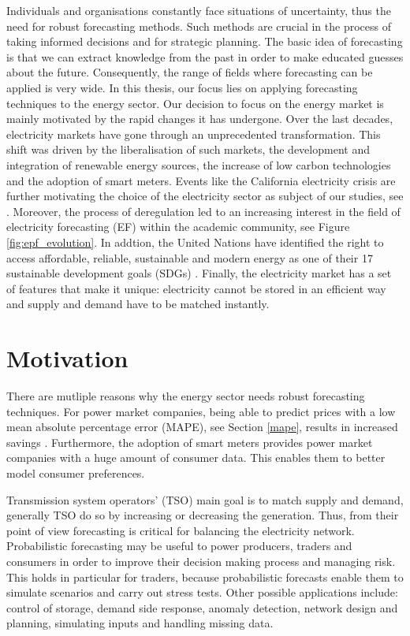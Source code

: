 Individuals and organisations constantly face situations of uncertainty, thus the need for robust forecasting methods. Such methods are crucial in the process of taking informed decisions and for strategic planning.
The basic idea of forecasting is that we can extract knowledge from the past in order to make educated guesses about the future. Consequently, the range of fields where forecasting can be applied is very wide.
In this thesis, our focus lies on applying forecasting techniques to the energy sector. 
Our decision to focus on the energy market is mainly motivated by the rapid changes it has undergone. %
Over the last decades, electricity markets have gone through an unprecedented transformation. This shift was driven by the liberalisation of such markets, the development and integration of renewable energy sources, the  increase of low carbon technologies and the adoption of smart meters. Events like the California electricity crisis are further motivating the choice of the electricity sector as subject of our studies, see \cite{california}.
Moreover, the process of deregulation led to an increasing interest in the field of electricity forecasting (EF) within the academic community, see Figure \ref{fig:epf_evolution}.
In addtion, the United Nations have identified the right to access affordable, reliable, sustainable and modern energy as one of their 17 sustainable development goals (SDGs) .
Finally, the electricity market has a set of features that make it unique: electricity cannot be stored in an efficient way and supply and demand have to be matched instantly.

\section{Motivation}
There are mutliple reasons why the energy sector needs robust forecasting techniques.
For power market companies, being able to predict prices with a low mean absolute percentage error (MAPE), see Section \ref{mape}, results in increased savings \cite{savings}. Furthermore, the adoption of smart meters provides power market companies with a huge amount of consumer data. This enables them to better model consumer preferences.

Transmission system operators' (TSO) main goal is to match supply and demand, generally TSO do so by increasing or decreasing the generation. Thus, from their point of view forecasting is critical for balancing the electricity network.
Probabilistic forecasting may be useful to power producers, traders and consumers in order to improve their decision making process and managing risk. This holds in particular for traders, because probabilistic forecasts enable them to simulate scenarios and carry out stress tests.
Other possible applications include: control of storage, demand side response, anomaly detection, network design and planning, simulating inputs and handling missing data.

